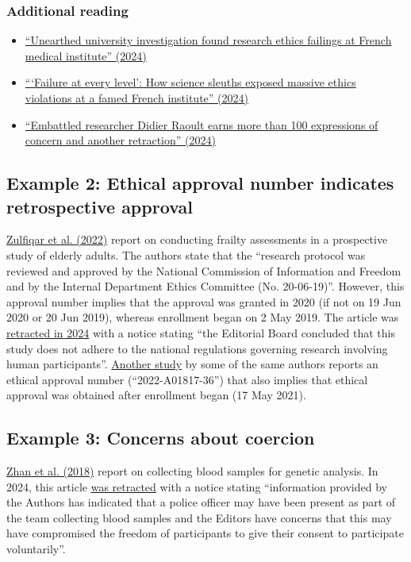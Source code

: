 \documentclass[letterpaper, 12pt]{article}
\begin{document}
\subsubsection*{Additional reading}

\begin{itemize}
    \setlength\itemsep{-0.5em}
    \item \href{https://www.science.org/content/article/unearthed-university-investigation-found-research-ethics-failings-french-medical}{``Unearthed university investigation found research ethics failings at French medical institute'' (2024)}
    \item \href{https://www.science.org/content/article/failure-every-level-how-science-sleuths-exposed-massive-ethics-violations-famed-french}{```Failure at every level': How science sleuths exposed massive ethics violations at a famed French institute'' (2024)}
    \item \href{https://retractionwatch.com/2024/04/03/embattled-researcher-didier-raoult-earns-dozens-more-expressions-of-concern-and-another-retraction/}{``Embattled researcher Didier Raoult earns more than 100 expressions of concern and another retraction'' (2024)}
\end{itemize}

\subsection*{Example 2: Ethical approval number indicates retrospective approval}

\href{https://doi.org/10.3390/medicines9070038}{Zulfiqar et al. (2022)} report on conducting frailty assessments in a prospective study of elderly adults. The authors state that the ``research protocol was reviewed and approved by the National Commission of Information and Freedom and by the Internal Department Ethics Committee (No. 20-06-19)''. However, this approval number implies that the approval was granted in 2020 (if not on 19 Jun 2020 or 20 Jun 2019), whereas enrollment began on 2 May 2019. The article was \href{https://doi.org/10.3390/medicines11080022}{retracted in 2024} with a notice stating ``the Editorial Board concluded that this study does not adhere to the national regulations governing research involving human participants''. \href{https://doi.org/10.3390/medicines9110058}{Another study} by some of the same authors reports an ethical approval number (``2022-A01817-36'') that also implies that ethical approval was obtained after enrollment began (17 May 2021).

\subsection*{Example 3: Concerns about coercion}

\href{https://doi.org/10.1038/s41598-018-22975-6}{Zhan et al. (2018)} report on collecting blood samples for genetic analysis. In 2024, this article \href{https://doi.org/10.1038/s41598-024-64860-5}{was retracted} with a notice stating ``information provided by the Authors has indicated that a police officer may have been present as part of the team collecting blood samples and the Editors have concerns that this may have compromised the freedom of participants to give their consent to participate voluntarily''.
\end{document}
